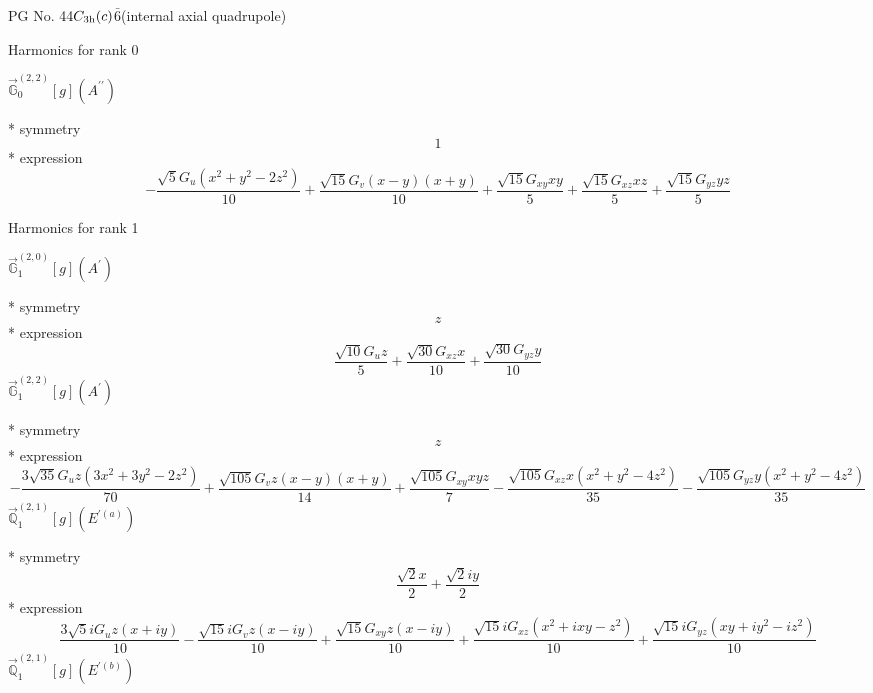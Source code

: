 \documentclass[fleqn,8pt]{jsarticle}
\begin{document}
\setcounter{MaxMatrixCols}{32}

\renewcommand{\tablename}{Table~}
\renewcommand{\figurename}{Figure~}
\begin{center}
\LARGE
PG No. 44\quad$C_{\rm 3h}(c)$\quad$\bar{6}$\quad[ hexagonal ] (internal axial quadrupole)
\end{center}

\noindent * Harmonics for rank 0

\noindent\quad $\vec{\mathbb{G}}_{0}^{(2,2)}[g](A^{\prime\prime})$

\noindent\quad ** symmetry
\begin{dmath*}
1
\end{dmath*}
\noindent\quad ** expression
\begin{dmath*}
- \frac{\sqrt{5} G_{u} \left(x^{2} + y^{2} - 2 z^{2}\right)}{10} + \frac{\sqrt{15} G_{v} \left(x - y\right) \left(x + y\right)}{10} + \frac{\sqrt{15} G_{xy} x y}{5} + \frac{\sqrt{15} G_{xz} x z}{5} + \frac{\sqrt{15} G_{yz} y z}{5}
\end{dmath*}

\noindent * Harmonics for rank 1

\noindent\quad $\vec{\mathbb{G}}_{1}^{(2,0)}[g](A^{\prime})$

\noindent\quad ** symmetry
\begin{dmath*}
z
\end{dmath*}
\noindent\quad ** expression
\begin{dmath*}
\frac{\sqrt{10} G_{u} z}{5} + \frac{\sqrt{30} G_{xz} x}{10} + \frac{\sqrt{30} G_{yz} y}{10}
\end{dmath*}
\noindent\quad $\vec{\mathbb{G}}_{1}^{(2,2)}[g](A^{\prime})$

\noindent\quad ** symmetry
\begin{dmath*}
z
\end{dmath*}
\noindent\quad ** expression
\begin{dmath*}
- \frac{3 \sqrt{35} G_{u} z \left(3 x^{2} + 3 y^{2} - 2 z^{2}\right)}{70} + \frac{\sqrt{105} G_{v} z \left(x - y\right) \left(x + y\right)}{14} + \frac{\sqrt{105} G_{xy} x y z}{7} - \frac{\sqrt{105} G_{xz} x \left(x^{2} + y^{2} - 4 z^{2}\right)}{35} - \frac{\sqrt{105} G_{yz} y \left(x^{2} + y^{2} - 4 z^{2}\right)}{35}
\end{dmath*}
\noindent\quad $\vec{\mathbb{Q}}_{1}^{(2,1)}[g](E^{\prime(a)})$

\noindent\quad ** symmetry
\begin{dmath*}
\frac{\sqrt{2} x}{2} + \frac{\sqrt{2} i y}{2}
\end{dmath*}
\noindent\quad ** expression
\begin{dmath*}
\frac{3 \sqrt{5} i G_{u} z \left(x + i y\right)}{10} - \frac{\sqrt{15} i G_{v} z \left(x - i y\right)}{10} + \frac{\sqrt{15} G_{xy} z \left(x - i y\right)}{10} + \frac{\sqrt{15} i G_{xz} \left(x^{2} + i x y - z^{2}\right)}{10} + \frac{\sqrt{15} i G_{yz} \left(x y + i y^{2} - i z^{2}\right)}{10}
\end{dmath*}
\noindent\quad $\vec{\mathbb{Q}}_{1}^{(2,1)}[g](E^{\prime(b)})$
\end{document}
